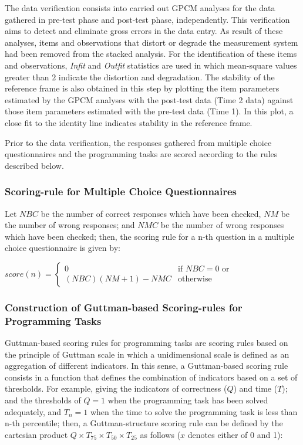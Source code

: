 The data verification consists into carried out GPCM analyses for the data gathered in pre-test phase and post-test phase, independently. This verification aims to detect and eliminate gross errors in the data entry. As result of these analyses, items and observations that distort or degrade the measurement system had been removed from the stacked analysis. For the identification of these items and observations, \emph{Infit} and \emph{Outfit} statistics are used in which mean-square values greater than $2$ indicate the distortion and degradation. The stability of the reference frame is also obtained in this step by plotting the item parameters estimated by the GPCM analyses with the post-test data (Time 2 data) against those item parameters estimated with the pre-test data (Time 1). In this plot, a close fit to the identity line indicates stability in the reference frame. %

Prior to the data verification, the responses gathered from multiple choice questionnaires and the programming tasks are scored according to the rules described below.

\subsubsection*{Scoring-rule for Multiple Choice Questionnaires}

Let $NBC$ be the number of correct responses which have been checked, $NM$ be the number of wrong responses; and $NMC$ be the number of wrong responses which have been checked; then, the scoring rule for a n-th question in a multiple choice questionnaire is given by:

$ score(n) = \begin{cases}
0 & \text{if } NBC = 0 \text{ or }  \\
(NBC)(NM+1) - NMC & \text{otherwise}
\end{cases}$

\subsubsection*{Construction of Guttman-based Scoring-rules for Programming Tasks}

Guttman-based scoring rules for programming tasks \cite{Guttman2017} are scoring rules based on the principle of Guttman scale in which a unidimensional scale is defined as an aggregation of different indicators. In this sense, a Guttman-based scoring rule consists in a function that defines the combination of indicators based on a set of thresholds. For example, giving the indicators of correctness ($Q$) and time ($T$); and the thresholds of $Q = 1$ when the programming task has been solved adequately, and $T_{n} = 1$ when the time to solve the programming task is less than n-th percentile; then, a Guttman-structure scoring rule can be defined by the cartesian product $Q{\times}T_{75}{\times}T_{50}{\times}T_{25}$ as follows ($x$ denotes either of 0 and 1):

